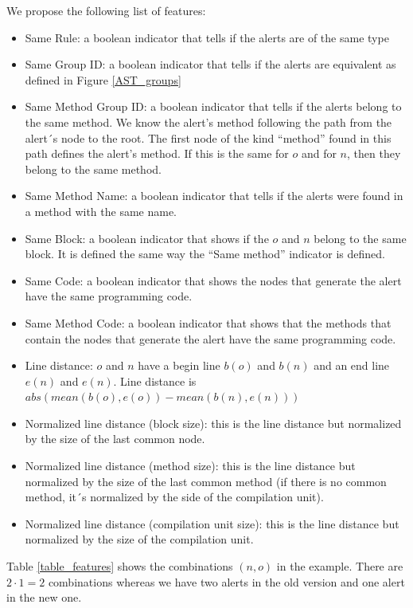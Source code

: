 \documentclass[
]{article}
\begin{document}
We propose the following list of features:

\begin{itemize}
\item
  Same Rule: a boolean indicator that tells if the alerts are of the
  same type
\item
  Same Group ID: a boolean indicator that tells if the alerts are
  equivalent as defined in Figure \ref{AST_groups}
\item
  Same Method Group ID: a boolean indicator that tells if the alerts
  belong to the same method. We know the alert's method following the
  path from the alert´s node to the root. The first node of the kind
  ``method'' found in this path defines the alert's method. If this is
  the same for \(o\) and for \(n\), then they belong to the same method.
\item
  Same Method Name: a boolean indicator that tells if the alerts were
  found in a method with the same name.
\item
  Same Block: a boolean indicator that shows if the \(o\) and \(n\)
  belong to the same block. It is defined the same way the ``Same
  method'' indicator is defined.
\item
  Same Code: a boolean indicator that shows the nodes that generate the
  alert have the same programming code.
\item
  Same Method Code: a boolean indicator that shows that the methods that
  contain the nodes that generate the alert have the same programming
  code.
\item
  Line distance: \(o\) and \(n\) have a begin line \(b(o)\) and \(b(n)\)
  and an end line \(e(n)\) and \(e(n)\). Line distance is
  \(abs(mean(b(o), e(o)) - mean(b(n), e(n)))\)
\item
  Normalized line distance (block size): this is the line distance but
  normalized by the size of the last common node.
\item
  Normalized line distance (method size): this is the line distance but
  normalized by the size of the last common method (if there is no
  common method, it´s normalized by the side of the compilation unit).
\item
  Normalized line distance (compilation unit size): this is the line
  distance but normalized by the size of the compilation unit.
\end{itemize}

Table \ref{table_features} shows the combinations \((n,o)\) in the
example. There are \(2 \cdot 1 = 2\) combinations whereas we have two
alerts in the old version and one alert in the new one.
\end{document}
